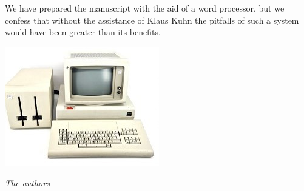We have prepared the manuscript with the aid of a word processor, but we confess that without the assistance of Klaus Kuhn the pitfalls of such a system would have been greater than its benefits.

\vspace{.5cm}
\begin{center}
\includegraphics{Apparaetle.jpg}
\end{center}
\vspace{.5cm}
\begin{flushright}\noindent
${}$\hfill {\it The authors} \\
\end{flushright}


